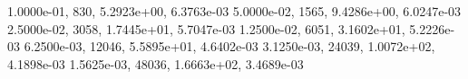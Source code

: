 1.0000e-01,   830, 5.2923e+00, 6.3763e-03
5.0000e-02,  1565, 9.4286e+00, 6.0247e-03
2.5000e-02,  3058, 1.7445e+01, 5.7047e-03
1.2500e-02,  6051, 3.1602e+01, 5.2226e-03
6.2500e-03, 12046, 5.5895e+01, 4.6402e-03
3.1250e-03, 24039, 1.0072e+02, 4.1898e-03
1.5625e-03, 48036, 1.6663e+02, 3.4689e-03
